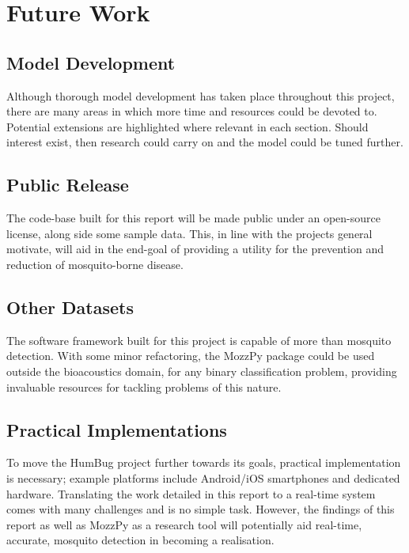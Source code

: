 \section{Future Work}
\label{sec:conc-future}
    \subsection{Model Development}
    \label{subsec:conc-future-dev}
        Although thorough model development has taken place throughout this project, there are many areas in which more time and resources could be devoted to. Potential extensions are highlighted where relevant in each section. Should interest exist, then research could carry on and the model could be tuned further. 
    \subsection{Public Release}
    \label{subsec:conc-future-public}
        The code-base built for this report will be made public under an open-source license, along side some sample data. This, in line with the projects general motivate, will aid in the end-goal of providing a utility for the prevention and reduction of mosquito-borne disease.

    \subsection{Other Datasets}
    \label{subsec:conc-future-datasets}
        The software framework built for this project is capable of more than mosquito detection. With some minor refactoring, the MozzPy package could be used outside the bioacoustics domain, for any binary classification problem, providing invaluable resources for tackling problems of this nature. 
        
    \subsection{Practical Implementations}
    \label{subsec:conc-future-prac}
        To move the HumBug project further towards its goals, practical implementation is necessary; example platforms include Android/iOS smartphones and dedicated hardware. Translating the work detailed in this report to a real-time system comes with many challenges and is no simple task. However, the findings of this report as well as MozzPy as a research tool will potentially aid real-time, accurate, mosquito detection in becoming a realisation.
    